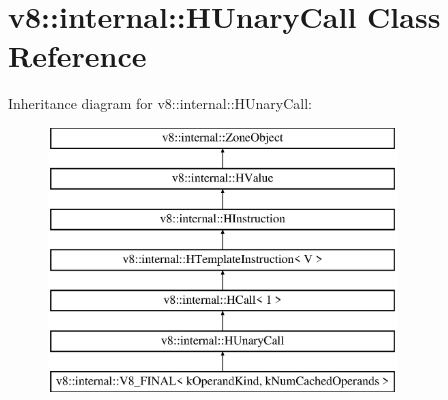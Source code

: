 \hypertarget{classv8_1_1internal_1_1_h_unary_call}{}\section{v8\+:\+:internal\+:\+:H\+Unary\+Call Class Reference}
\label{classv8_1_1internal_1_1_h_unary_call}
Inheritance diagram for v8\+:\+:internal\+:\+:H\+Unary\+Call\+:\begin{figure}[H]
\begin{center}
\leavevmode
\includegraphics[height=7.000000cm]{classv8_1_1internal_1_1_h_unary_call}
\end{center}
\end{figure}
